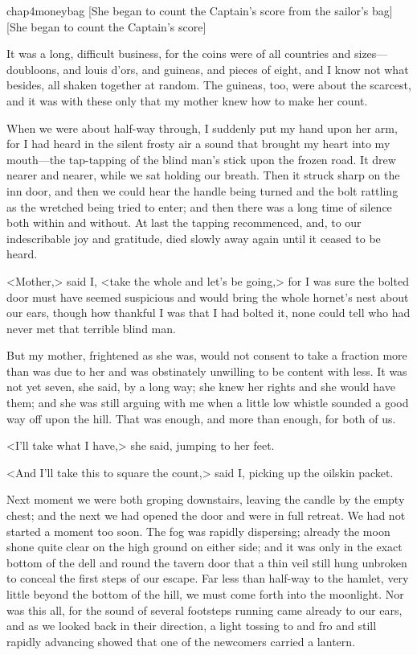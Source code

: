 \begin{bwbigpic}
	[\basicscale]
	{chap4moneybag}
	[She began to count the Captain's score from the sailor's bag]
	[She began to count the Captain's score]
\end{bwbigpic}

It was a long, difficult business, for the coins were of all countries and sizes—doubloons, and louis d'ors, and guineas, and pieces of eight, and I know not what besides, all shaken together at random. The guineas, too, were about the scarcest, and it was with these only that my mother knew how to make her count.

When we were about half-way through, I suddenly put my hand upon her arm, for I had heard in the silent frosty air a sound that brought my heart into my mouth—the tap-tapping of the blind man's stick upon the frozen road. It drew nearer and nearer, while we sat holding our breath. Then it struck sharp on the inn door, and then we could hear the handle being turned and the bolt rattling as the wretched being tried to enter; and then there was a long time of silence both within and without. At last the tapping recommenced, and, to our indescribable joy and gratitude, died slowly away again until it ceased to be heard.

<Mother,> said I, <take the whole and let's be going,> for I was sure the bolted door must have seemed suspicious and would bring the whole hornet's nest about our ears, though how thankful I was that I had bolted it, none could tell who had never met that terrible blind man.

But my mother, frightened as she was, would not consent to take a fraction more than was due to her and was obstinately unwilling to be content with less. It was not yet seven, she said, by a long way; she knew her rights and she would have them; and she was still arguing with me when a little low whistle sounded a good way off upon the hill. That was enough, and more than enough, for both of us.

<I'll take what I have,> she said, jumping to her feet.

<And I'll take this to square the count,> said I, picking up the oilskin packet.

Next moment we were both groping downstairs, leaving the candle by the empty chest; and the next we had opened the door and were in full retreat. We had not started a moment too soon. The fog was rapidly dispersing; already the moon shone quite clear on the high ground on either side; and it was only in the exact bottom of the dell and round the tavern door that a thin veil still hung unbroken to conceal the first steps of our escape. Far less than half-way to the hamlet, very little beyond the bottom of the hill, we must come forth into the moonlight. Nor was this all, for the sound of several footsteps running came already to our ears, and as we looked back in their direction, a light tossing to and fro and still rapidly advancing showed that one of the newcomers carried a lantern.

